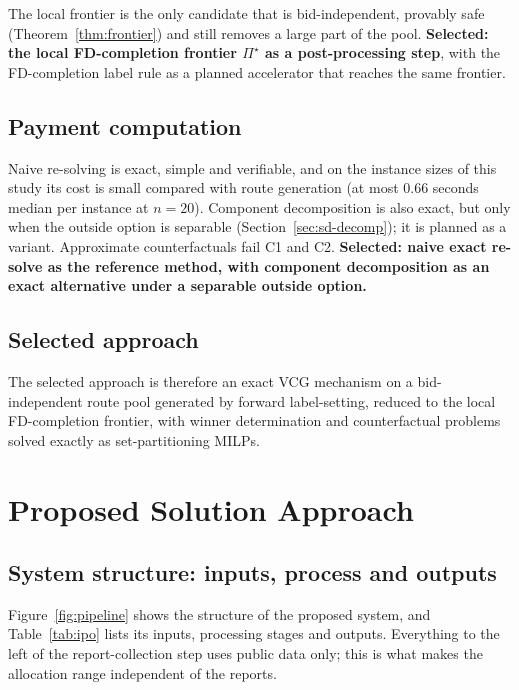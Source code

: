 The local frontier is the only candidate that is bid-independent, provably
safe (Theorem~\ref{thm:frontier}) and still removes a large part of the pool.
\textbf{Selected: the local FD-completion frontier $\Pi^\star$ as a
post-processing step}, with the FD-completion label rule as a planned
accelerator that reaches the same frontier.

\subsection{Payment computation}

Naive re-solving is exact, simple and verifiable, and on the instance sizes
of this study its cost is small compared with route generation (at most
0.66 seconds median per instance at $n=20$). Component decomposition is
also exact, but only when the outside option is separable
(Section~\ref{sec:sd-decomp}); it is planned as a variant. Approximate counterfactuals fail C1
and C2. \textbf{Selected: naive exact re-solve as the reference method, with
component decomposition as an exact alternative under a separable outside
option.}

\subsection{Selected approach}

The selected approach is therefore an exact VCG mechanism on a
bid-independent route pool generated by forward label-setting, reduced to
the local FD-completion frontier, with winner determination and
counterfactual problems solved exactly as set-partitioning MILPs.

\section{Proposed Solution Approach}
\label{sec:design}

\subsection{System structure: inputs, process and outputs}

Figure~\ref{fig:pipeline} shows the structure of the proposed system, and
Table~\ref{tab:ipo} lists its inputs, processing stages and outputs.
Everything to the left of the report-collection step uses public data only;
this is what makes the allocation range independent of the reports.

